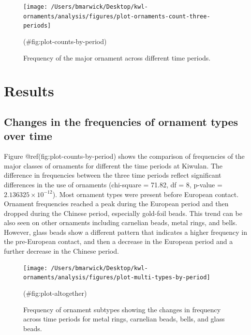 \documentclass[]{article}
\begin{document}
\begin{figure}
\texttt{[image: /Users/bmarwick/Desktop/kwl-ornaments/analysis/figures/plot-ornaments-count-three-periods]} \caption{Frequency of the major ornament across different time periods.}(\#fig:plot-counts-by-period)
\end{figure}

\hypertarget{results}{%
\section{Results}\label{results}}

\hypertarget{changes-in-the-frequencies-of-ornament-types-over-time}{%
\subsection{Changes in the frequencies of ornament types over
time}\label{changes-in-the-frequencies-of-ornament-types-over-time}}

Figure @ref(fig:plot-counts-by-period) shows the comparison of
frequencies of the major classes of ornaments for different the time
periods at Kiwulan. The difference in frequencies between the three time
periods reflect significant differences in the use of ornaments
(chi-square = 71.82, df = 8, p-value =
\(\ensuremath{2.136325\times 10^{-12}}\)). Most ornament types were
present before European contact. Ornament frequencies reached a peak
during the European period and then dropped during the Chinese period,
especially gold-foil beads. This trend can be also seen on other
ornaments including carnelian beads, metal rings, and bells. However,
glass beads show a different pattern that indicates a higher frequency
in the pre-European contact, and then a decrease in the European period
and a further decrease in the Chinese period.

\begin{figure}
\texttt{[image: /Users/bmarwick/Desktop/kwl-ornaments/analysis/figures/plot-multi-types-by-period]} \caption{Frequency of ornament subtypes showing the changes in frequency across time periods for metal rings, carnelian beads, bells, and glass beads.}(\#fig:plot-altogether)
\end{figure}
\end{document}
